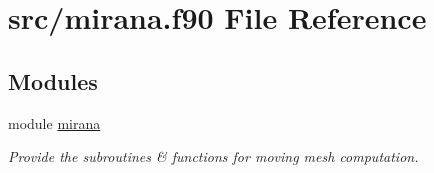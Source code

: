 \hypertarget{mirana_8f90}{}\section{src/mirana.f90 File Reference}
\label{mirana_8f90}
\subsection*{Modules}
\begin{DoxyCompactItemize}
\item 
module \hyperlink{namespacemirana}{mirana}
\begin{DoxyCompactList}\small\item\em Provide the subroutines \& functions for moving mesh computation. \end{DoxyCompactList}\end{DoxyCompactItemize}
